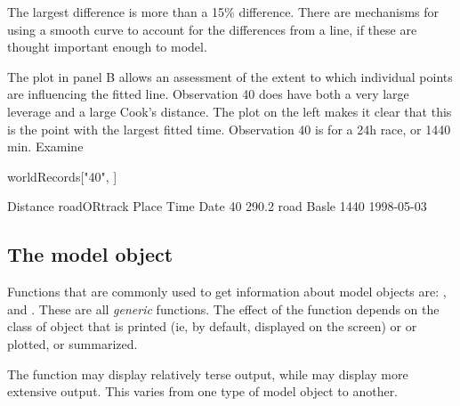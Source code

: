 \pagebreak
The largest difference is more than a 15\% difference. There are
mechanisms for using a smooth curve to account for the differences
from a line, if these are thought important enough to model.

The plot in panel B allows an assessment of the extent to which individual
points are influencing the fitted line.  Observation 40 does have both
a very large leverage and a large Cook's distance.  The plot on the
left makes it clear that this is the point with the largest fitted
time. Observation 40 is for a 24h race, or 1440 min. Examine
\begin{Schunk}
\begin{Sinput}
worldRecords["40", ]
\end{Sinput}
\begin{Soutput}
   Distance roadORtrack Place Time       Date
40    290.2        road Basle 1440 1998-05-03
\end{Soutput}
\end{Schunk}

\subsection{The model object}\label{ss:modobj}

Functions that are commonly used to get information
about model objects are: ,  and
.  These are all \textit{generic} functions. The effect
of the function depends on the class of object that is printed (ie, by
default, displayed on the screen) or or plotted, or summarized.

The function  may display relatively terse
output, while  may display more extensive output.
This varies from one type of model object to another.

